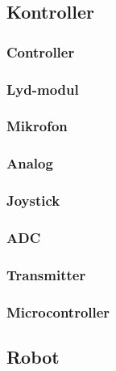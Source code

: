 \subsection{Kontroller}
\subsubsection*{Controller}
\subsubsection*{Lyd-modul}
\subsubsection*{Mikrofon}
\subsubsection*{Analog}
\subsubsection*{Joystick}
\subsubsection*{ADC}
\subsubsection*{Transmitter}
\subsubsection*{Microcontroller}



\subsection{Robot}